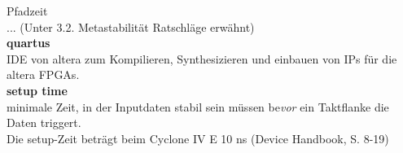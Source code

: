 Pfadzeit\\
... (Unter 3.2. Metastabilität Ratschläge erwähnt)\\



\textbf{quartus}\\
IDE von altera zum Kompilieren, Synthesizieren und einbauen von IPs für die altera FPGAs.\\


\textbf{setup time} \\
minimale Zeit, in der Inputdaten stabil sein müssen be\textit{vor} ein Taktflanke die Daten triggert.\\
Die setup-Zeit beträgt beim Cyclone IV E 10 ns (Device Handbook, S. 8-19)\\




